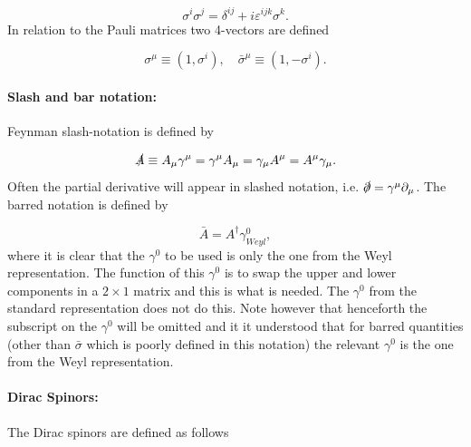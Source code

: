 \begin{equation}
	\sigma^i \sigma^j=\delta^{ij}+i\varepsilon^{ijk}\sigma^k.
\end{equation} 
In relation to the Pauli matrices two 4-vectors are defined

\begin{equation}
	\sigma^\mu\equiv (1,\sigma^i), \quad \bar{ \sigma}^\mu\equiv (1,-\sigma^i).
\end{equation} 

\paragraph{Slash and bar notation:}
Feynman slash-notation is defined by

\begin{equation}
	\slashed A \equiv A_\mu\gamma^\mu=\gamma^\mu A_\mu=\gamma_\mu A^\mu=A^\mu\gamma_\mu.
\end{equation} 
Often the partial derivative will appear in slashed notation, i.e. $\slashed \partial =\gamma^\mu\partial _\mu$. The barred notation is defined by

\begin{equation}
	\bar{A}=A^\dagger \gamma^0_{Weyl},
\end{equation} 
where it is clear that the $\gamma^0$ to be used is only the one from the Weyl representation. The function of this $\gamma^0$ is to swap the upper and lower components in a $2\times 1$ matrix and this is what is needed. The $\gamma^0$ from the standard representation does not do this. Note however that henceforth the subscript on the $\gamma^0$ will be omitted and it it understood that for barred quantities (other than $\bar{\sigma}$ which is poorly defined in this notation) the relevant $\gamma^0$ is the one from the Weyl representation.

\paragraph{Dirac Spinors:} The Dirac spinors are defined as follows

